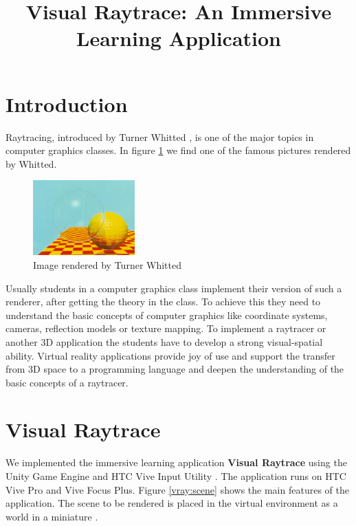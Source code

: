 \documentclass{VRARWorkshop}
\title{Visual Raytrace: An Immersive Learning Application}
\begin{document}

\section{Introduction}
Raytracing, introduced by Turner Whitted \cite{whitted_80}, is one of the major topics in
computer graphics classes.
In figure \ref{intro:whitted} we find one of the famous pictures rendered by Whitted.

\begin{figure}[h!]
    \begin{center}
        \includegraphics[width=0.35\textwidth]{whitted02.jpg}
        \caption{\label{intro:whitted} Image rendered by Turner Whitted \cite{checkerSpheres}}
    \end{center}
\end{figure}
Usually students in a computer graphics class implement their version of such a renderer,
after getting the theory in the class.
To achieve this they need to understand the basic concepts of computer graphics like coordinate systems,
cameras, reflection models or texture mapping. To implement a raytracer or another 3D application the students have to
develop a strong visual-spatial ability. Virtual reality applications provide joy of use and support the transfer
from 3D space to a programming language and deepen the understanding of the basic concepts of a raytracer.
%
\section{Visual Raytrace}
We implemented the immersive learning application \textbf{Visual Raytrace} \cite{saerota_21, visualraytrace} using the Unity Game Engine
and HTC Vive Input Utility \cite{viveInput}.
The application runs on HTC Vive Pro and Vive Focus Plus.
Figure \ref{vray:scene} shows the main features of the application.
The scene to be rendered is placed in the virtual environment as a world in a miniature \cite{pausch_95}.
\end{document}
